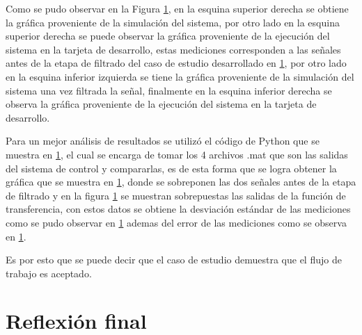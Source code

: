Como se pudo observar en la Figura \ref{}, en la esquina superior derecha se obtiene la gráfica proveniente de la simulación del sistema, por otro lado en la esquina superior derecha se puede observar la gráfica proveniente de la ejecución del sistema en la tarjeta de desarrollo, estas mediciones corresponden a las señales antes de la etapa de filtrado del caso de estudio desarrollado en \ref{}, por otro lado en la esquina inferior izquierda se tiene la  gráfica proveniente de la simulación del sistema una vez filtrada la señal, finalmente en la esquina inferior derecha se observa la gráfica proveniente de la ejecución del sistema en la tarjeta de desarrollo. 

Para un mejor análisis de resultados se utilizó el código de Python que se muestra en \ref{}, el cual se encarga de tomar los 4 archivos .mat que son las salidas del sistema de control y compararlas, es de esta forma que se logra obtener la gráfica que se muestra en \ref{}, donde se sobreponen las dos señales antes de la etapa de filtrado y en la figura \ref{} se muestran sobrepuestas las salidas de la función de transferencia, con estos datos se obtiene la desviación estándar de las mediciones como se pudo observar en \ref{} ademas del error de las mediciones como se observa en \ref{}.

Es por esto que se puede decir que el caso de estudio demuestra que el flujo de trabajo es aceptado.

\section{Reflexión final}